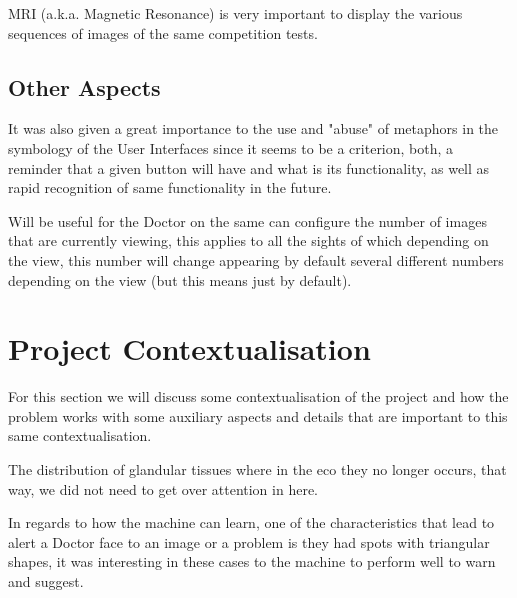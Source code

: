 MRI (a.k.a. Magnetic Resonance) is very important to display the various sequences of images of the same competition tests.

\subsection{Other Aspects}

It was also given a great importance to the use and "abuse" of metaphors in the symbology of the User Interfaces since it seems to be a criterion, both, a reminder that a given button will have and what is its functionality, as well as rapid recognition of same functionality in the future.

Will be useful for the Doctor on the same can configure the number of images that are currently viewing, this applies to all the sights of which depending on the view, this number will change appearing by default several different numbers depending on the view (but this means just by default).


\section{Project Contextualisation}

For this section we will discuss some contextualisation of the project and how the problem works with some auxiliary aspects and details that are important to this same contextualisation.

The distribution of glandular tissues where in the eco they no longer occurs, that way, we did not need to get over attention in here.

In regards to how the machine can learn, one of the characteristics that lead to alert a Doctor face to an image or a problem is they had spots with triangular shapes, it was interesting in these cases to the machine to perform well to warn and suggest.

